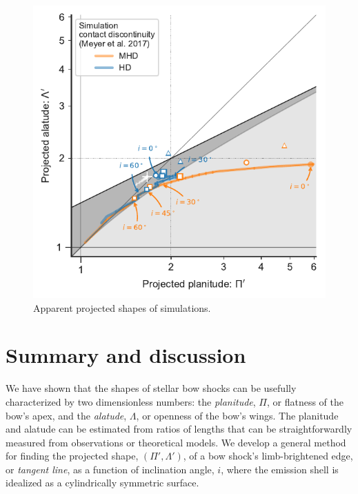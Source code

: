 \begin{figure}
  \centering
  \includegraphics[width=\linewidth]{figs/m17-planitude-alatude}
  \caption{Apparent projected shapes of simulations.}
  \label{fig:sim-Pi-Lambda}
\end{figure}


\section{Summary and discussion}
\label{sec:conc}

We have shown that the shapes of stellar bow shocks can be usefully
characterized by two dimensionless numbers: the \textit{planitude},
\(\Pi\), or flatness of the bow's apex, and the \textit{alatude},
\(\Lambda\), or openness of the bow's wings.  The planitude and alatude can
be estimated from ratios of lengths that can be straightforwardly
measured from observations or theoretical models.  We develop a
general method for finding the projected shape,
\((\Pi', \Lambda')\), of a bow shock's limb-brightened edge, or
\textit{tangent line}, as a function of inclination angle, \(i\),
where the emission shell is idealized as a cylindrically symmetric
surface.

